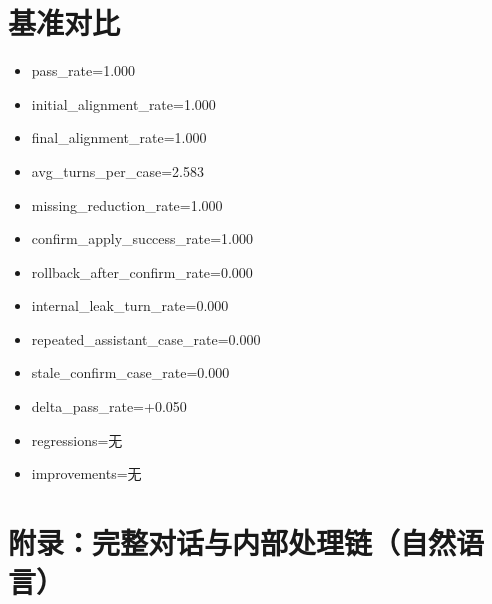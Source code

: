 \documentclass[11pt]{ctexart}
\begin{document}
\section{基准对比}
\begin{itemize}
\item pass\_rate=1.000
\item initial\_alignment\_rate=1.000
\item final\_alignment\_rate=1.000
\item avg\_turns\_per\_case=2.583
\item missing\_reduction\_rate=1.000
\item confirm\_apply\_success\_rate=1.000
\item rollback\_after\_confirm\_rate=0.000
\item internal\_leak\_turn\_rate=0.000
\item repeated\_assistant\_case\_rate=0.000
\item stale\_confirm\_case\_rate=0.000
\item delta\_pass\_rate=+0.050
\item regressions=无
\item improvements=无
\end{itemize}
\appendix
\section{附录：完整对话与内部处理链（自然语言）}
\end{document}
